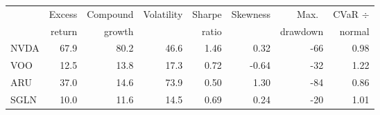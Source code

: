\begin{tabular}{lrrrrrrr}
\toprule
 & Excess & Compound & Volatility & Sharpe & Skewness & Max.\ & CVaR $\div$ \\
 & return & growth & & ratio & & drawdown & normal \\
\midrule
NVDA & 67.9 & 80.2 & 46.6 & 1.46 & 0.32 & -66 & 0.98 \\
VOO & 12.5 & 13.8 & 17.3 & 0.72 & -0.64 & -32 & 1.22 \\
ARU & 37.0 & 14.6 & 73.9 & 0.50 & 1.30 & -84 & 0.86 \\
SGLN & 10.0 & 11.6 & 14.5 & 0.69 & 0.24 & -20 & 1.01 \\
\bottomrule
\end{tabular}
